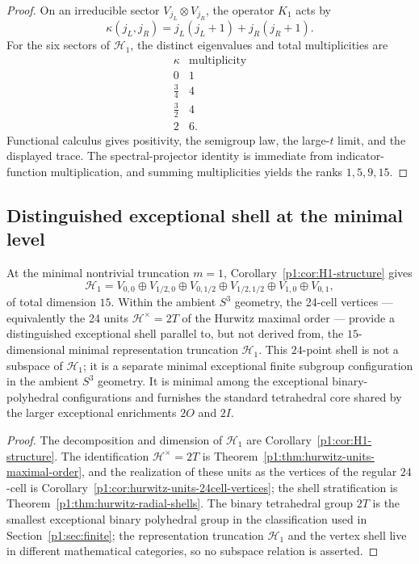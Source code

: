 \documentclass[11pt]{article}
\begin{document}
\begin{proof}
On an irreducible sector \(V_{j_L}\otimes V_{j_R}\), the operator \(K_1\)
acts by
\[
    \kappa(j_L,j_R)
    =j_L(j_L+1)+j_R(j_R+1).
\]
For the six sectors of \(\mathcal H_1\), the distinct eigenvalues and total
multiplicities are
\[
\begin{array}{c|c}
\kappa&\text{multiplicity}\\
\hline
0&1\\
\frac34&4\\
\frac32&4\\
2&6.
\end{array}
\]
Functional calculus gives positivity, the semigroup law, the large-\(t\) limit,
and the displayed trace.  The spectral-projector identity is immediate from
indicator-function multiplication, and summing multiplicities yields the ranks
\(1,5,9,15\).
\end{proof}

\subsection{Distinguished exceptional shell at the minimal level}
\label{p1:subsec:24cell-canonical}

\begin{proposition}
\label{p1:prop:minimal-exceptional-shell-H1}
At the minimal nontrivial truncation \(m=1\), Corollary~\ref{p1:cor:H1-structure} gives
\[
\mathcal H_1
=
V_{0,0}\oplus V_{1/2,0}\oplus V_{0,1/2}\oplus V_{1/2,1/2}\oplus V_{1,0}\oplus V_{0,1},
\]
of total dimension \(15\).  Within the ambient \(S^3\) geometry, the 24-cell vertices --- equivalently the 24 units
\(\mathcal H^\times=2T\) of the Hurwitz maximal order --- provide a distinguished exceptional shell
parallel to, but not derived from, the \(15\)-dimensional minimal representation truncation \(\mathcal H_1\). This \(24\)-point shell is not a subspace of \(\mathcal H_1\); it is a separate minimal exceptional finite subgroup configuration in the ambient \(S^3\) geometry.  It is minimal among the exceptional binary-polyhedral configurations and furnishes the standard tetrahedral core shared by the larger exceptional enrichments \(2O\) and \(2I\).
\end{proposition}

\begin{proof}
The decomposition and dimension of \(\mathcal H_1\) are Corollary~\ref{p1:cor:H1-structure}.  The identification \(\mathcal H^\times=2T\) is Theorem~\ref{p1:thm:hurwitz-units-maximal-order}, and the realization of these units as the vertices of the regular \(24\)-cell is Corollary~\ref{p1:cor:hurwitz-units-24cell-vertices}; the shell stratification is Theorem~\ref{p1:thm:hurwitz-radial-shells}.  The binary tetrahedral group \(2T\) is the smallest exceptional binary polyhedral group in the classification used in Section~\ref{p1:sec:finite}; the representation truncation \(\mathcal H_1\) and the vertex shell live in different mathematical categories, so no subspace relation is asserted.
\end{proof}
\end{document}
